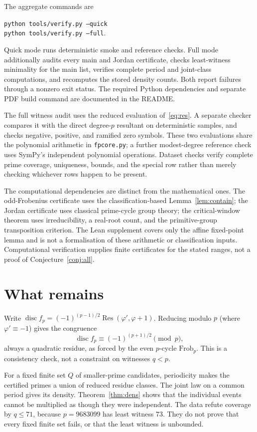 \documentclass[11pt,a4paper]{amsart}
\newcommand{\disc}{\operatorname{disc}}
\newcommand{\Res}{\operatorname{Res}}
\newcommand{\Frob}{\mathrm{Frob}}
\theoremstyle{plain}
\theoremstyle{definition}
\begin{document}
The aggregate commands are
\begin{center}
\texttt{python tools/verify.py --quick}\\
\texttt{python tools/verify.py --full}.
\end{center}
Quick mode runs deterministic smoke and reference checks. Full mode additionally audits every main and Jordan certificate, checks least-witness minimality for the main list, verifies complete period and joint-class computations, and recomputes the stored density counts. Both report failures through a nonzero exit status. The required Python dependencies and separate PDF build command are documented in the README.

The full witness audit uses the reduced evaluation of~\eqref{eq:res}. A separate checker compares it with the direct degree-\(p\) resultant on deterministic samples, and checks negative, positive, and ramified zero symbols. These two evaluations share the polynomial arithmetic in \texttt{fpcore.py}; a further modest-degree reference check uses SymPy's independent polynomial operations. Dataset checks verify complete prime coverage, uniqueness, bounds, and the special row rather than merely checking whichever rows happen to be present.

The computational dependencies are distinct from the mathematical ones. The odd-Frobenius certificate uses the classification-based Lemma~\ref{lem:contain}; the Jordan certificate uses classical prime-cycle group theory; the critical-window theorem uses irreducibility, a real-root count, and the primitive-group transposition criterion. The Lean supplement covers only the affine fixed-point lemma and is not a formalisation of these arithmetic or classification inputs. Computational verification supplies finite certificates for the stated ranges, not a proof of Conjecture~\ref{conj:all}.

\section{What remains}
\label{sec:open}

Write \(\disc f_p=(-1)^{(p-1)/2}\Res(\varphi',\varphi+1)\). Reducing modulo \(p\) (where \(\varphi'\equiv-1\)) gives the congruence
\[
\disc f_p\equiv(-1)^{(p+1)/2}\pmod p,
\]
always a quadratic residue, as forced by the even \(p\)-cycle \(\Frob_p\). This is a consistency check, not a constraint on witnesses \(q<p\).

For a fixed finite set \(Q\) of smaller-prime candidates, periodicity makes the certified primes a union of reduced residue classes. The joint law on a common period gives its density. Theorem~\ref{thm:dens} shows that the individual events cannot be multiplied as though they were independent. The data refute coverage by \(q\le71\), because \(p=9683099\) has least witness \(73\). They do not prove that every fixed finite set fails, or that the least witness is unbounded.
\end{document}
